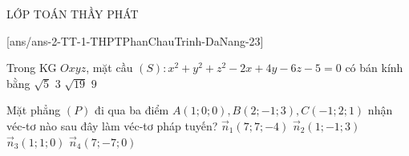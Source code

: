 \begin{name}
	{\tenchude}{\tendethi}{LỚP TOÁN THẦY PHÁT}{\thoigian}
\end{name}
[ans/ans-2-TT-1-THPTPhanChauTrinh-DaNang-23]
\setcounter{ex}{0}\setcounter{bt}{0}
\begin{ex}%
	Trong KG $Oxyz$, mặt cầu $(S)\colon x^2+y^2+z^2-2x+4y-6z-5=0$ có bán kính bằng 
	\choice
	{$\sqrt{5}$}
	{$3$}
	{\True $\sqrt{19}$}
	{$9$}
\end{ex}
\begin{ex}%
	Mặt phẳng $(P)$ đi qua ba điểm $A(1; 0; 0), B(2;-1; 3), C(-1; 2; 1)$ nhận véc-tơ nào sau đây làm véc-tơ pháp tuyến?
	\choice
	{$\vec{n}_1(7; 7;-4)$}
	{$\vec{n}_2(1;-1; 3)$}
	{\True $\vec{n}_3(1; 1; 0)$}
	{$\vec{n}_4(7;-7; 0)$}
\end{ex}

